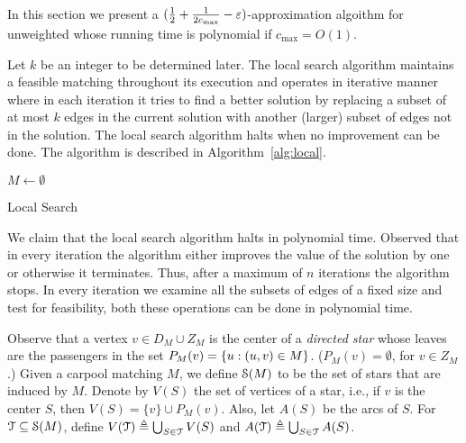 
In this section we present a $(\frac{1}{2} + \frac{1}{2c_{\max}}
- \varepsilon)$-approximation algoithm for unweighted \carpool whose running
time is polynomial if $c_{\max} = O(1)$.

Let $k$ be an integer to be determined later.  The local search
algorithm maintains a feasible matching throughout its execution and
operates in iterative manner where in each iteration it tries to find
a better solution by replacing a subset of at most $k$ edges in the
current solution with another (larger) subset of edges not in the
solution.  The local search algorithm halts when no improvement can be
done.  The algorithm is described in Algorithm~\ref{alg:local}.

\begin{algorithm}
$M \leftarrow \emptyset$								\\

\caption{Local Search}
\label{alg:local}
\end{algorithm}


We claim that the local search algorithm halts in polynomial time.
Observed that in every iteration the algorithm either improves the
value of the solution by one or otherwise it terminates.  Thus, after
a maximum of $n$ iterations the algorithm stops.  In every iteration
we examine all the subsets of edges of a fixed size and test for
feasibility, both these operations can be done in polynomial time.

Observe that a vertex $v \in D_M \cup Z_M$ is the center of
a \emph{directed star} whose leaves are the passengers in the set
$P_M(v) = \left\{ u : (u,v) \in M \right\}$.  ($P_M(v) = \emptyset$, for $v \in
Z_M$.)
%
Given a carpool matching $M$, we define $\mathcal{S}(M)$ to be the set of
stars that are induced by $M$.  Denote by $V(S)$ the set of vertices
of a star, i.e., if $v$ is the center $S$, then $V(S) = \{v\} \cup
P_M(v)$.  Also, let $A(S)$ be the arcs of $S$.  For
$\mathcal{T} \subseteq \mathcal{S}(M)$, define
$V(\mathcal{T}) \triangleq \bigcup_{S \in \mathcal{T}} V(S)$ and
$A(\mathcal{T}) \triangleq \bigcup_{S \in \mathcal{T}} A(S)$.

